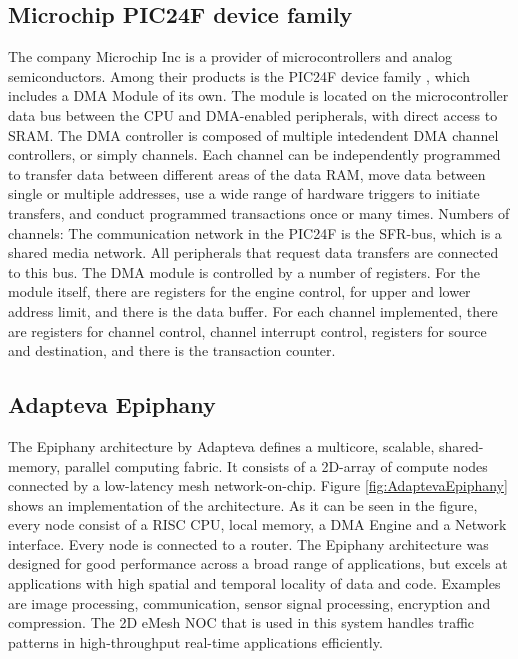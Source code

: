 \subsection{Microchip PIC24F device family}
The company Microchip Inc is a provider of microcontrollers and analog semiconductors.
Among their products is the PIC24F device family \cite{microchip1}, which includes a DMA Module of its own\cite{microchip54}.
The module is located on the microcontroller data bus between the CPU and DMA-enabled peripherals, with direct access to SRAM.
The DMA controller is composed of multiple intedendent DMA channel controllers, or simply channels.
Each channel can be independently programmed to transfer data between different areas of the data RAM, move data between single or multiple addresses, use a wide range of hardware triggers to initiate transfers, and conduct programmed transactions once or many times. 
Numbers of channels: 
The communication network in the PIC24F is the SFR-bus, which is a shared media network.
All peripherals that request data transfers are connected to this bus.
The DMA module is controlled by a number of registers.
For the module itself, there are registers for the engine control, for upper and lower address limit, and there is the data buffer.
For each channel implemented, there are registers for channel control, channel interrupt control, registers for source and destination, and there is the transaction counter. 

\subsection{Adapteva Epiphany}
The Epiphany architecture by Adapteva \cite{epiphany} defines a multicore, scalable, shared-memory, parallel computing fabric.
It consists of a 2D-array of compute nodes connected by a low-latency mesh network-on-chip.
Figure \ref{fig:AdaptevaEpiphany} shows an implementation of the architecture.
As it can be seen in the figure, every node consist of a RISC CPU, local memory, a DMA Engine and a Network interface.
Every node is connected to a router.
The Epiphany architecture was designed for good performance across a broad range of applications, but excels at applications with high spatial and temporal locality of data and code.
Examples are image processing, communication, sensor signal processing, encryption and compression.
The 2D eMesh NOC that is used in this system handles traffic patterns in high-throughput real-time applications efficiently.

